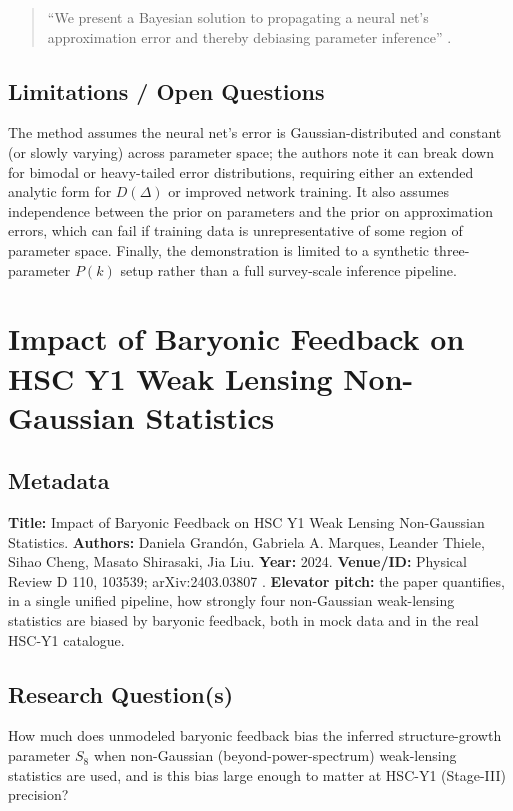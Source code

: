 \documentclass[11pt]{article}
\begin{document}
\begin{quote}
\enquote{We present a Bayesian solution to propagating a neural net's approximation error and thereby debiasing parameter inference} \citep[p.~1]{grandon2022bayesian}.
\end{quote}

\subsection{Limitations / Open Questions}
The method assumes the neural net's error is Gaussian-distributed and constant (or slowly varying) across parameter space; the authors note it can break down for bimodal or heavy-tailed error distributions, requiring either an extended analytic form for $D(\Delta)$ or improved network training. It also assumes independence between the prior on parameters and the prior on approximation errors, which can fail if training data is unrepresentative of some region of parameter space. Finally, the demonstration is limited to a synthetic three-parameter $P(k)$ setup rather than a full survey-scale inference pipeline.

\section{Impact of Baryonic Feedback on HSC Y1 Weak Lensing Non-Gaussian Statistics}
\label{sec:paper2}

\subsection{Metadata}
\textbf{Title:} Impact of Baryonic Feedback on HSC Y1 Weak Lensing Non-Gaussian Statistics. \textbf{Authors:} Daniela Grandón, Gabriela A. Marques, Leander Thiele, Sihao Cheng, Masato Shirasaki, Jia Liu. \textbf{Year:} 2024. \textbf{Venue/ID:} Physical Review D 110, 103539; arXiv:2403.03807 \citep{grandon2024baryonic}. \textbf{Elevator pitch:} the paper quantifies, in a single unified pipeline, how strongly four non-Gaussian weak-lensing statistics are biased by baryonic feedback, both in mock data and in the real HSC-Y1 catalogue.

\subsection{Research Question(s)}
How much does unmodeled baryonic feedback bias the inferred structure-growth parameter $S_8$ when non-Gaussian (beyond-power-spectrum) weak-lensing statistics are used, and is this bias large enough to matter at HSC-Y1 (Stage-III) precision?
\end{document}
